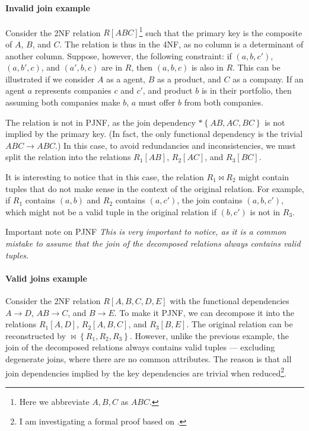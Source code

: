 \paragraph{Invalid join example} Consider the 2NF relation $R[ABC]$\footnote{Here we abbreviate ${A,
B, C}$ as $ABC$.} such that the primary key is the composite of $A$, $B$, and $C$.  The
relation is thus in the 4NF, as no column is a determinant of another column.  Suppose,
however, the following constraint: if $(a, b, c')$, $(a, b', c)$, and $(a', b, c)$ are in
$R$, then $(a, b, c)$ is also in $R$.  This can be illustrated if we consider $A$ as a
agent, $B$ as a product, and $C$ as a company.  If an agent $a$ represents companies $c$ and
$c'$, and product $b$ is in their portfolio, then assuming both companies make $b$, $a$
must offer $b$ from both companies.

The relation is not in PJNF, as the join dependency $* \left\{ AB, AC, BC \right\}$ is not
implied by the primary key.  (In fact, the only functional dependency is the trivial $ABC
\to ABC$.)  In this case, to avoid redundancies and inconsistencies, we must split the
relation into the relations $R_1[AB]$, $R_2[AC]$, and $R_3[BC]$.

It is interesting to notice that in this case, the relation $R_1 \bowtie R_2$ might
contain tuples that do not make sense in the context of the original relation.  For
example, if $R_1$ contains $(a, b)$ and $R_2$ contains $(a, c')$, the join contains
$(a, b, c')$, which might not be a valid tuple in the original relation if $(b, c')$ is
not in $R_3$.

\begin{hlbox}{Important note on PJNF}
  \em
  This is very important to notice, as it is a common mistake to assume
  that the join of the decomposed relations always contains valid tuples.
\end{hlbox}

\paragraph{Valid joins example}  Consider the 2NF relation $R[A, B, C, D, E]$ with the functional
dependencies $A \to D$, $AB \to C$, and $B \to E$.  To make it PJNF, we can decompose it
into the relations $R_1[A, D]$, $R_2[A, B, C]$, and $R_3[B, E]$.  The original relation can
be reconstructed by $\bowtie \left\{ R_1, R_2, R_3 \right\}$.  However, unlike the
previous example, the join of the decomposed relations always contains valid tuples
--- excluding degenerate joins, where there are no common attributes.
The reason is that all join dependencies implied by the key dependencies are trivial when
reduced\footnote{I am investigating a formal proof based on .}.

